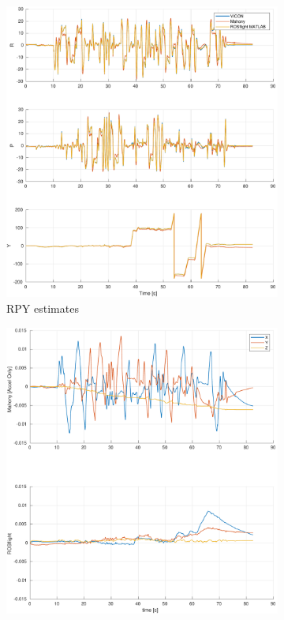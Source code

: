 \documentclass[a4paper]{article}
\begin{document}
\begin{figure}[H]
  \centering
  \begin{subfigure}[t]{0.31\textwidth}
    \includegraphics[width=\textwidth]{estrpy_ext15.pdf}
    \caption{RPY estimates}
    \label{fig:scf_meas}
  \end{subfigure}\hfill
  \begin{subfigure}[t]{0.31\textwidth}
    \includegraphics[width=\textwidth]{estbias_ext15.pdf}

\end{subfigure}
\end{figure}
\end{document}
